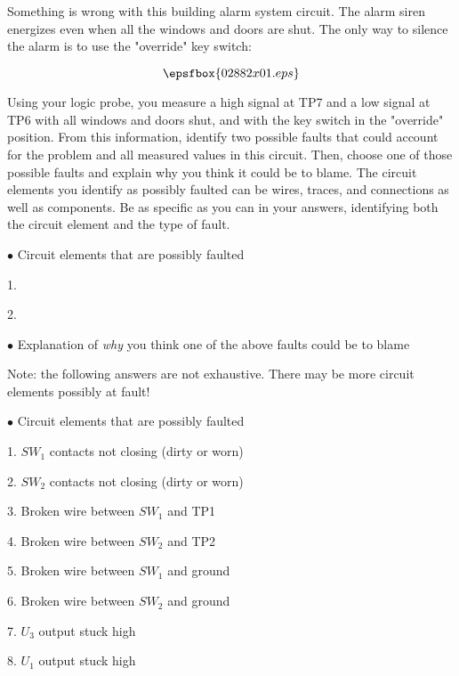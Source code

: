 

Something is wrong with this building alarm system circuit.  The alarm siren energizes even when all the windows and doors are shut.  The only way to silence the alarm is to use the "override" key switch:

$$\epsfbox{02882x01.eps}$$

Using your logic probe, you measure a high signal at TP7 and a low signal at TP6 with all windows and doors shut, and with the key switch in the "override" position.  From this information, identify two possible faults that could account for the problem and all measured values in this circuit.  Then, choose one of those possible faults and explain why you think it could be to blame.  The circuit elements you identify as possibly faulted can be wires, traces, and connections as well as components.  Be as specific as you can in your answers, identifying both the circuit element and the type of fault.

\medskip
\goodbreak
\item{$\bullet$} Circuit elements that are possibly faulted
\item{1.}
\item{2.} 
\medskip

\medskip
\goodbreak
\item{$\bullet$} Explanation of {\it why} you think one of the above faults could be to blame

\vskip 30pt







Note: the following answers are not exhaustive.  There may be more circuit elements possibly at fault!

\medskip
\goodbreak
\item{$\bullet$} Circuit elements that are possibly faulted
\item{1.} $SW_1$ contacts not closing (dirty or worn)
\item{2.} $SW_2$ contacts not closing (dirty or worn)
\item{3.} Broken wire between $SW_1$ and TP1
\item{4.} Broken wire between $SW_2$ and TP2
\item{5.} Broken wire between $SW_1$ and ground
\item{6.} Broken wire between $SW_2$ and ground
\item{7.} $U_3$ output stuck high
\item{8.} $U_1$ output stuck high
\medskip


